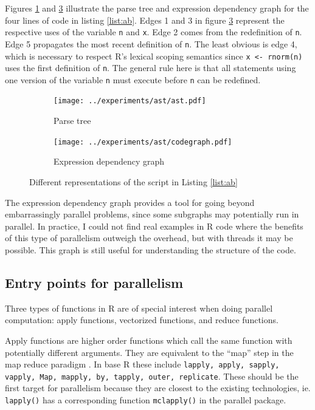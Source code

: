 \documentclass[12pt]{article}
\begin{document}
Figures \ref{fig:ast} and \ref{fig:codegraph} illustrate the 
parse tree and expression dependency graph for the four lines of code in
listing \ref{list:ab}.  Edges 1 and 3 in figure \ref{fig:codegraph} represent the
respective uses of the variable \texttt{n} and \texttt{x}.  Edge 2 comes
from the redefinition of \texttt{n}.  Edge 5 propagates the most recent
definition of \texttt{n}.  The least obvious is edge 4, which is necessary
to respect R's lexical scoping semantics since \texttt{x <- rnorm(n)} uses
the first definition of \texttt{n}. The general rule here is that all
statements using one version of the variable \texttt{n} must execute before \texttt{n}
can be redefined.



\begin{figure}
\centering
\begin{subfigure}{.6\textwidth}
    \centering
    \texttt{[image: ../experiments/ast/ast.pdf]}
    \caption{Parse tree}
    \label{fig:ast}
\end{subfigure}%
\begin{subfigure}{.4\textwidth}
  \centering
  \texttt{[image: ../experiments/ast/codegraph.pdf]}
  \caption{Expression dependency graph}
  \label{fig:codegraph}
\end{subfigure}
\caption{Different representations of the script in Listing \ref{list:ab}}
\end{figure}

The expression dependency graph provides a tool for going beyond
embarrassingly parallel problems, since some subgraphs may potentially run
in parallel. In practice, I could not find real examples in R code where
the benefits of this type of parallelism outweigh the overhead, but with
threads it may be possible. This graph is still useful for understanding
the structure of the code.

\subsection{Entry points for parallelism}

Three types of functions in R are of special interest when doing parallel
computation: apply functions, vectorized functions, and reduce functions.

Apply functions are higher order functions which call the same function
with potentially different arguments. They are equivalent to the ``map''
step in the map reduce paradigm \cite{dean2008mapreduce}.  In base R these
include \texttt{lapply, apply, sapply, vapply, Map, mapply, by, tapply,
outer, replicate}. These should be the first target for parallelism because
they are closest to the existing technologies, ie. \texttt{lapply()} has a
corresponding function \texttt{mclapply()} in the parallel package.
\end{document}
